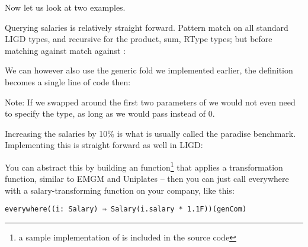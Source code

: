 

Now let us look at two examples.

\begin{example}

Querying salaries is relatively straight forward. Pattern match on all standard
LIGD types, and recursive for the product, sum, RType types; but before matching
against  match against :



We can however also use the generic fold we implemented earlier, the definition
becomes a single line of code then:



Note: If we swapped around the first two parameters of  we would not even
need to specify the  type, as long as we would pass  instead
of 0.

\end{example}

\begin{example}

Increasing the salaries by 10\% is what is usually called the paradise
benchmark. Implementing this is straight forward as well in LIGD:



You can abstract this by building an  function\footnote{a sample implementation of  is included in the source code} that applies
a transformation function, similar to EMGM and Uniplates  -- then
you can just call everywhere with a salary-transforming function on your company,
like this:
\begin{lstlisting}[caption=Increase the salaries using \cd{everywhere}]
  everywhere((i: Salary) ⇒ Salary(i.salary * 1.1F))(genCom)
\end{lstlisting}

\end{example}

